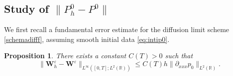\documentclass[a4paper,french,english,10pt]{article}
\newcommand\eps{\varepsilon}
\newcommand\W{\mathbf{W}}
\newtheorem{proposition}[theorem]{Proposition}
\begin{document}


\subsection{Study of $\| P_h^0 - P^0  \|$}

We  first 
 recall a fundamental   error estimate \cite{FV}
for the diffusion limit scheme \eqref{schemadifff}, assuming smooth initial data \eqref{eq:intip0}. 
\begin{proposition}\label{ds1d}
There exists a constant $C(T)>0$ such that
\begin{equation*}
\|\W_h^\eps-\W^\eps\|_{L^{\infty}([0,T];L^2(\mathbb{R}))} \leq
C(T)h \| \partial_{xxx}p_0 \|_{L^2(\mathbb{R})  }.
\end{equation*}
\end{proposition}
\end{document}
